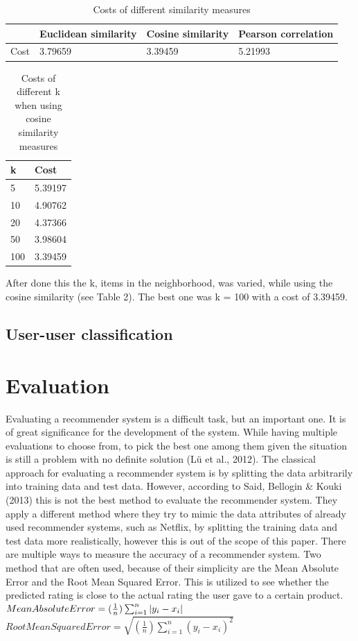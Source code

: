 \documentclass[11pt]{article}
\begin{document}
\newpage

\begin{table}[]
\begin{tabular}{@{}|l|l|l|l|@{}}
\toprule
     & Euclidean similarity & Cosine similarity & Pearson correlation \\ \midrule
Cost & 3.79659              & 3.39459           & 5.21993             \\ \bottomrule
\end{tabular}
\caption{Costs of different similarity measures}
\end{table}


\begin{table}[]
\begin{tabular}{@{}ll@{}}
\toprule
k   & Cost    \\ \midrule
5   & 5.39197 \\
10  & 4.90762 \\
20  & 4.37366 \\
50  & 3.98604 \\
100 & 3.39459 \\ \bottomrule
\end{tabular}
\caption{Costs of different k when using cosine similarity measures}
\end{table}

After done this the k, items in the neighborhood, was varied, while using the cosine similarity (see Table 2). The best one was k = 100 with a cost of 3.39459.

\subsection{User-user classification}
\section{Evaluation}
Evaluating a recommender system is a difficult task, but an important one. It is of great significance for the development of the system. While having multiple evaluations to choose from, to pick the best one among them given the situation is still a problem with no definite solution (Lü et al., 2012).  The classical approach for evaluating a recommender system is by splitting the data arbitrarily into training data and test data. However, according to Said, Bellogin & Kouki (2013) this is not the best method to evaluate the recommender system. They apply a different method where they try to mimic the data attributes of already used recommender systems, such as Netflix, by splitting the training data and test data more realistically, however this is out of the scope of this paper. There are multiple ways to measure the accuracy of a recommender system. Two method that are often used, because of their simplicity are the Mean Absolute Error and the Root Mean Squared Error. This is utilized to see whether the predicted rating is close to the actual rating the user gave to a certain product. \\
\m
$Mean Absolute Error =  (\frac{1}{n})\sum_{i=1}^{n}\left | y_{i} - x_{i} \right |\\
$$Root Mean Squared Error = \sqrt{(\frac{1}{n})\sum_{i=1}^{n}(y_{i} - x_{i})^{2}} $
\end{document}
